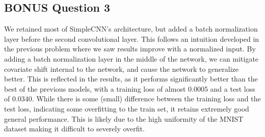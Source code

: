 \documentclass{article}
\begin{document}
\subsection{BONUS Question 3}
We retained most of SimpleCNN's architecture, but added a batch normalization layer before the second convolutional layer. This follows an intuition developed in the previous problem where we saw results improve with a normalized input. By adding a batch normalization layer in the middle of the network, we can mitigate covariate shift internal to the network, and cause the network to generalize better. This is reflected in the results, as it performs significantly better than the best of the previous models, with a training loss of almost 0.0005 and a test loss of 0.0340. While there is some (small) difference between the training loss and the test loss, indicating some overfitting to the train set, it retains extremely good general performance. This is likely due to the high uniformity of the MNIST dataset making it difficult to severely overfit. 
\end{document}

